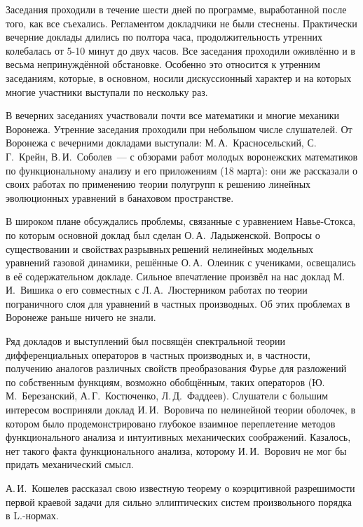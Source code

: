 Заседания проходили в течение шести дней по программе, выработанной после того, как все съехались.
Регламентом докладчики не были стеснены.
Практически вечерние доклады длились по полтора часа,
продолжительность
\linebreak
утренних колебалась от 5-10 минут до двух часов.
Все заседания проходили оживлённо и в весьма непринуждённой обстановке. Особенно это относится к утренним заседаниям, которые, в основном, носили дискуссионный характер и на которых многие участники выступали по нескольку раз.

В вечерних заседаниях участвовали почти все математики и многие механики Воронежа.
Утренние заседания проходили при небольшом числе слушателей.
От Воронежа с вечерними докладами выступали:
М.\,А.~Красносельский,
\linebreak
С.\,Г.~Крейн, В.\,И.~Соболев~--- с обзорами работ молодых воронежских математиков по функциональному анализу и его приложениям (18 марта): они же рассказали о своих работах по применению теории полугрупп к решению линейных эволюционных уравнений в банаховом пространстве.

В широком плане обсуждались проблемы, связанные с уравнением Навье-Стокса, по которым основной доклад был сделан О.\,А.~Ладыженской. Вопросы о существовании и \linebreak свойствах\,разрывных\,решений нелинейных модельных уравнений газовой динамики, решённые О.\,А.~Олеиник с учениками, освещались в её содержательном докладе. Сильное впечатление произвёл на нас доклад М.\,И.~Вишика о его совместных с Л.\,А.~Люстерником работах по теории пограничного слоя для уравнений в частных производных. Об этих проблемах в Воронеже раньше ничего не знали.

Ряд докладов и выступлений был посвящён спектральной теории дифференциальных операторов в частных производных и,
в частности, получению аналогов различных свойств преобразования Фурье для разложений по собственным функциям,
возможно обобщённым, таких операторов
(Ю.\,М.~Березанский, А.\,Г.~Костюченко, Л.\,Д.~Фаддеев).
Слушатели с большим интересом восприняли доклад И.\,И.~Воровича по нелинейной теории оболочек,
в котором было продемонстрировано глубокое взаимное переплетение методов функционального анализа и интуитивных механических соображений. Казалось, нет такого факта функционального анализа, которому И.\,И.~Ворович не мог бы придать механический смысл.

А.\,И.~Кошелев рассказал свою известную теорему о коэрцитивной разрешимости первой краевой задачи для сильно эллиптических систем произвольного порядка в L.-нормах.

